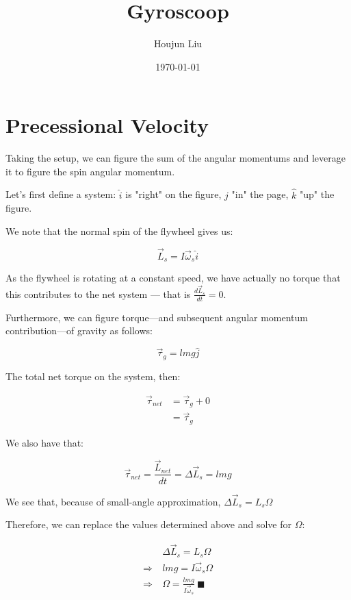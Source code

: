 \documentclass[letterpaper]{article}
\author{Houjun Liu}
\date{\today}
\title{Gyroscoop}
\renewcommand{\tableofcontents}{}
\renewcommand\maketitle{}
\begin{document}
\maketitle
\tableofcontents


\section{Precessional Velocity}
\label{sec:org0712c8d}
Taking the setup, we can figure the sum of the angular momentums and leverage it to figure the spin angular momentum.

Let's first define a system: \(\hat{i}\) is "right" on the figure, \(\hat{j}\) "in" the page, \(\hat{k}\) "up" the figure.

We note that the normal spin of the flywheel gives us:

\begin{equation}
   \vec{L}_s = I\vec{\omega}_s \hat{i}
\end{equation}

As the flywheel is rotating at a constant speed, we have actually no torque that this contributes to the net system --- that is \(\frac{d\vec{L}_s}{dt} = 0\). 

Furthermore, we can figure torque---and subsequent angular momentum contribution---of gravity as follows:

\begin{equation}
    \vec{\tau}_g = lmg \hat{j}
\end{equation}

The total net torque on the system, then:

\begin{align}
   \vec{\tau}_{net} &= \vec{\tau}_g + 0 \\
&= \vec{\tau}_g
\end{align}

We also have that:

\begin{equation}
   \vec{\tau}_{net} = \frac{\vec{L}_{net}}{dt} = \Delta \vec{L}_s = lmg
\end{equation}

We see that, because of small-angle approximation, \(\Delta \vec{L}_s = L_s \Omega\)

Therefore, we can replace the values determined above and solve for \(\Omega\):

\begin{align}
    &\Delta \vec{L}_s = L_s \Omega\\
\Rightarrow\ & lmg = I\vec{\omega}_s \Omega\\
\Rightarrow\ & \Omega = \frac{lmg}{I\vec{\omega}_s}\ \blacksquare
\end{align}
\end{document}
